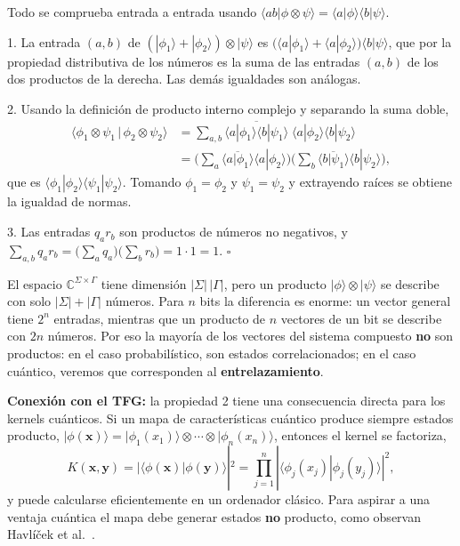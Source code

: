 \documentclass[11pt, a4paper, twoside, openright]{report}
\begin{document}
\begin{tcolorbox}[colback=gray!5!white,colframe=gray!75!black,title=\textbf{Demostración}]
Todo se comprueba entrada a entrada usando $\langle ab|\phi\otimes\psi\rangle = \langle a|\phi\rangle\langle b|\psi\rangle$.

1. La entrada $(a,b)$ de $(|\phi_1\rangle + |\phi_2\rangle)\otimes|\psi\rangle$ es $\big(\langle a|\phi_1\rangle + \langle a|\phi_2\rangle\big)\langle b|\psi\rangle$, que por la propiedad distributiva de los números es la suma de las entradas $(a,b)$ de los dos productos de la derecha. Las demás igualdades son análogas.

2. Usando la definición de producto interno complejo y separando la suma doble,
\begin{align*}
\big\langle \phi_1 \otimes \psi_1 \,\big|\, \phi_2 \otimes \psi_2 \big\rangle
&= \sum_{a,b} \overline{\langle a|\phi_1\rangle\langle b|\psi_1\rangle}\;\langle a|\phi_2\rangle\langle b|\psi_2\rangle \\
&= \Big(\sum_a \overline{\langle a|\phi_1\rangle}\langle a|\phi_2\rangle\Big)\Big(\sum_b \overline{\langle b|\psi_1\rangle}\langle b|\psi_2\rangle\Big),
\end{align*}
que es $\langle\phi_1|\phi_2\rangle\langle\psi_1|\psi_2\rangle$. Tomando $\phi_1 = \phi_2$ y $\psi_1 = \psi_2$ y extrayendo raíces se obtiene la igualdad de normas.

3. Las entradas $q_a r_b$ son productos de números no negativos, y $\sum_{a,b} q_a r_b = \big(\sum_a q_a\big)\big(\sum_b r_b\big) = 1 \cdot 1 = 1$. \hfill $\square$
\end{tcolorbox}

\begin{tcolorbox}[colback=blue!5!white,colframe=blue!75!black,title=\textbf{Nota Aclaratoria: No todo vector es un producto tensorial}]
El espacio $\mathbb{C}^{\Sigma\times\Gamma}$ tiene dimensión $|\Sigma|\,|\Gamma|$, pero un producto $|\phi\rangle\otimes|\psi\rangle$ se describe con solo $|\Sigma| + |\Gamma|$ números. Para $n$ bits la diferencia es enorme: un vector general tiene $2^n$ entradas, mientras que un producto de $n$ vectores de un bit se describe con $2n$ números. Por eso la mayoría de los vectores del sistema compuesto \textbf{no} son productos: en el caso probabilístico, son estados correlacionados; en el caso cuántico, veremos que corresponden al \textbf{entrelazamiento}.

\textbf{Conexión con el TFG:} la propiedad 2 tiene una consecuencia directa para los kernels cuánticos. Si un mapa de características cuántico produce siempre estados producto, $|\phi(\mathbf{x})\rangle = |\phi_1(x_1)\rangle \otimes\cdots\otimes|\phi_n(x_n)\rangle$, entonces el kernel se factoriza,
\[ K(\mathbf{x},\mathbf{y}) = |\langle\phi(\mathbf{x})|\phi(\mathbf{y})\rangle|^2 = \prod_{j=1}^n |\langle\phi_j(x_j)|\phi_j(y_j)\rangle|^2, \]
y puede calcularse eficientemente en un ordenador clásico. Para aspirar a una ventaja cuántica el mapa debe generar estados \textbf{no} producto, como observan Havlíček et al.\ \cite{havlicek2019supervised}.
\end{tcolorbox}
\end{document}
